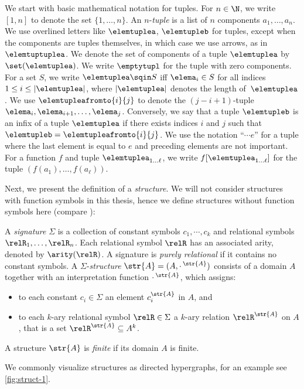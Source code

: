 We start with basic mathematical notation for tuples.
For $n \in \N$, we write $[1,n]$ to denote the set $\{1, \ldots, n \}$.
An $n$-\emph{tuple} is a list of $n$ components $a_{1}, \ldots{}, a_{n}$.
We use overlined letters like $\elemtuplea$, $\elemtupleb$ for tuples, except when the components are tuples themselves, in which case we use arrows, as in $\elemtuptuplea$.
We denote the set of components of a tuple $\elemtuplea$ by $\set(\elemtuplea)$.
We write $\emptytupl$ for the tuple with zero components.
For a set $S$, we write $\elemtuplea \sqin S$ iff $\elema_i \in S$ for all indices $1 \leq i \leq |\elemtuplea|$, where $|\elemtuplea|$ denotes the length of~$\elemtuplea$.
We use $\elemtupleafromto{i}{j}$ to denote the $(j{-}i{+}1)$-tuple $\elema_i, \elema_{i+1}, \ldots, \elema_j$.
Conversely, we say that a tuple $\elemtupleb$ is an infix of a tuple $\elemtuplea$ if there exists indices $i$ and $j$ such that $\elemtupleb = \elemtupleafromto{i}{j}$.
We use the notation ``$\cdots e$'' for a tuple where the last element is equal to $e$ and preceding elements are not important.
For a function $f$ and tuple $\elemtuplea_{1\ldots\ell}$, we write $f[\elemtuplea_{1\ldots\ell}]$ for the tuple $(f(a_{1}), \ldots, f(a_{\ell}))$.

Next, we present the definition of a \emph{structure}.
We will not consider structures with function symbols in this thesis, hence we define structures without function symbols here (compare \cite[Definition 2.1]{Libkin04}):
\begin{definition}[Structures]
  A \emph{signature} $\Sigma$ is a collection of constant symbols $c_{1}, \cdots, c_{k}$ and relational symbols $\relR_{1}, \ldots, \relR_{n}$.
  Each relational symbol $\relR$ has an associated arity, denoted by $\arity(\relR)$.
  A signature is \emph{purely relational} if it contains no constant symbols.
  A $\Sigma$-\emph{structure} $\str{A} = (A, {\cdot\,}^{\str{A}})$ consists of a domain $A$ together with an interpretation function ${\cdot\,}^{\str{A}}$, which assigns:
  \begin{itemize}
    \item to each constant $c_{i} \in \Sigma$ an element $c_{i}^{\str{A}}$ in $A$, and
    \item to each $k$-ary relational symbol $\relR \in \Sigma$ a $k$-ary relation $\relR^{\str{A}}$ on $A$, that is a set $\relR^{\str{A}} \subseteq A^{k}$.
  \end{itemize}
  A structure $\str{A}$ is \emph{finite} if its domain $A$ is finite.
\end{definition}
We commonly visualize structures as directed hypergraphs, for an example see \cref{fig:struct-1}.

